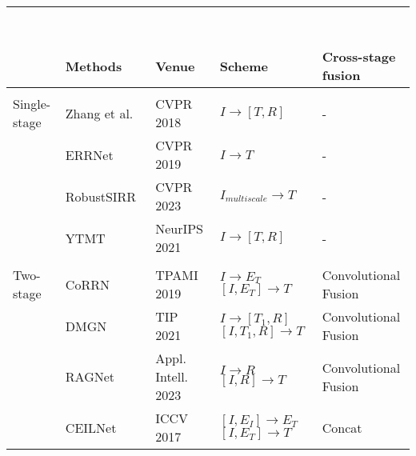 \begin{table*}
\centering
\renewcommand{\dashlinedash}{0.5pt} 
\renewcommand{\dashlinegap}{2pt}    
\begin{tabular}{lllll}
\hline\hline
 & \shortstack[l]{\space \\ \space \\ \textbf{Methods} \\ \space } & 
   \shortstack[l]{\space \\ \space \\ \textbf{Venue} \\ \space } & 
   \shortstack[l]{\space \\ \space \\ \textbf{Scheme} \\ \space } & 
   \shortstack[l]{\space \\ \space \\ \textbf{Cross-stage fusion} \\ \space} \\
\bottomrule   \\
Single-stage
& Zhang et al.~\cite{zhang2018single} & CVPR 2018 & $I \rightarrow [T, R]$ & - \\ 
& ERRNet~\cite{wei2019single} & CVPR 2019 & $I \rightarrow T$ & - \\ 
& RobustSIRR~\cite{song2023robust} & CVPR 2023 & $I_{multiscale} \rightarrow T$ & - \\
& YTMT~\cite{hu2021trash} & NeurIPS 2021 & $I \rightarrow [T, R]$ & - \\   \bottomrule   \\
Two-stage
& CoRRN~\cite{wan2019corrn} & TPAMI 2019 & \shortstack[l]{\space \\$I \rightarrow E_{T}$ \\ $[I, E_{T}] \rightarrow T$} & Convolutional Fusion \\ \cline{2-5}
& DMGN~\cite{feng2021deep} & TIP 2021 & \shortstack[l]{\space \\ $I \rightarrow [T_{1}, R]$ \\ $[I, T_{1}, R] \rightarrow T$} & Convolutional Fusion \\ \cline{2-5}
& RAGNet~\cite{li2023two} & Appl. Intell. 2023 & \shortstack[l]{\space \\ $I \rightarrow R$ \\ $ [I, R] \rightarrow T$} & Convolutional Fusion \\ \cline{2-5}
& CEILNet~\cite{fan2017generic} & ICCV 2017 & \shortstack[l]{\space \\ $[I, E_{I}] \rightarrow E_{T}$ \\ $[I, E_{T}] \rightarrow T$ } & Concat \\ \cline{2-5}

\end{tabular}
\end{table*}
